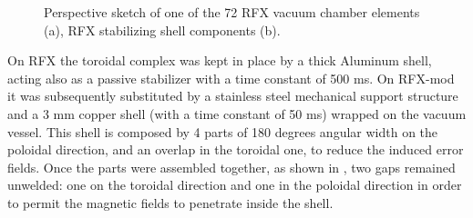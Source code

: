 \begin{figure}[ht!]
\centering
{}
\caption{ Perspective sketch of one of the 72 RFX vacuum chamber elements (a), RFX stabilizing shell components (b). }
\end{figure}

On RFX the toroidal complex was kept in place by a thick Aluminum shell, acting also as a passive stabilizer with a time constant of 500 ms. On RFX-mod it was subsequently substituted by a stainless steel mechanical support structure and a 3 mm copper shell (with a time constant of 50 ms) wrapped on the vacuum vessel. This shell is composed by 4 parts of 180 degrees angular width on the poloidal direction, and an overlap in the toroidal one, to reduce the induced error fields. Once the parts were assembled together, as shown in \Figure{\ref{fig:rfx_shell}}, two gaps remained unwelded: one on the toroidal direction and one in the poloidal direction in order to permit the magnetic fields to penetrate inside the shell\cite{th13}.

